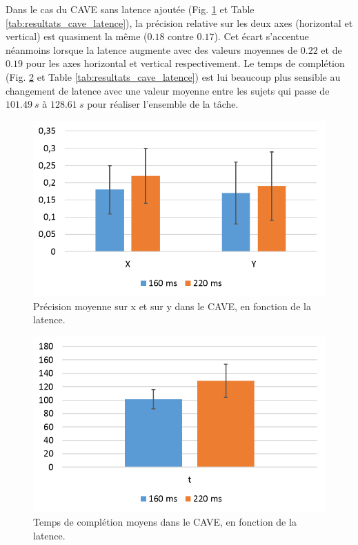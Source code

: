 	\par Dans le cas du CAVE sans latence ajoutée (Fig. \ref{fig:cave_precision} et Table \ref{tab:resultats_cave_latence}), la précision relative sur les deux axes (horizontal et vertical) est quasiment la même ($0.18$ contre $0.17$). Cet écart s'accentue néanmoins lorsque la latence augmente avec des valeurs moyennes de $0.22$ et de $0.19$ pour les axes horizontal et vertical respectivement. Le temps de complétion (Fig. \ref{fig:cave_completion_time} et Table \ref{tab:resultats_cave_latence}) est lui beaucoup plus sensible au changement de latence avec une valeur moyenne entre les sujets qui passe de $101.49~s$ à $128.61~s$ pour réaliser l'ensemble de la tâche.

	\begin{figure}
		\centering
		\includegraphics[width=0.8\linewidth]{Figures/CavePrecisionResults.png}
		\caption{Précision moyenne sur x et sur y dans le CAVE, en fonction de la latence.}
		\label{fig:cave_precision}
	\end{figure}
	
	\begin{figure}
		\centering
		\includegraphics[width=0.8\linewidth]{Figures/CaveCompletionTimeResults.png}
		\caption{Temps de complétion moyens dans le CAVE, en fonction de la latence.}
		\label{fig:cave_completion_time}
	\end{figure}
	

